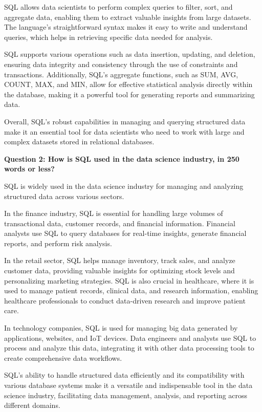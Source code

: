 \documentclass[a4paper, 11pt]{report}
\begin{document}
SQL allows data scientists to perform complex queries to filter, sort, and aggregate data, enabling them to extract valuable insights from large datasets. The language's straightforward syntax makes it easy to write and understand queries, which helps in retrieving specific data needed for analysis.

SQL supports various operations such as data insertion, updating, and deletion, ensuring data integrity and consistency through the use of constraints and transactions. Additionally, SQL's aggregate functions, such as SUM, AVG, COUNT, MAX, and MIN, allow for effective statistical analysis directly within the database, making it a powerful tool for generating reports and summarizing data.

Overall, SQL's robust capabilities in managing and querying structured data make it an essential tool for data scientists who need to work with large and complex datasets stored in relational databases.

\vspace{\baselineskip}

\textbf{Question 2: How is SQL used in the data science industry, in 250 words or less?}

SQL is widely used in the data science industry for managing and analyzing structured data across various sectors.

In the finance industry, SQL is essential for handling large volumes of transactional data, customer records, and financial information. Financial analysts use SQL to query databases for real-time insights, generate financial reports, and perform risk analysis.

In the retail sector, SQL helps manage inventory, track sales, and analyze customer data, providing valuable insights for optimizing stock levels and personalizing marketing strategies. SQL is also crucial in healthcare, where it is used to manage patient records, clinical data, and research information, enabling healthcare professionals to conduct data-driven research and improve patient care.

In technology companies, SQL is used for managing big data generated by applications, websites, and IoT devices. Data engineers and analysts use SQL to process and analyze this data, integrating it with other data processing tools to create comprehensive data workflows.

SQL's ability to handle structured data efficiently and its compatibility with various database systems make it a versatile and indispensable tool in the data science industry, facilitating data management, analysis, and reporting across different domains.
\end{document}
